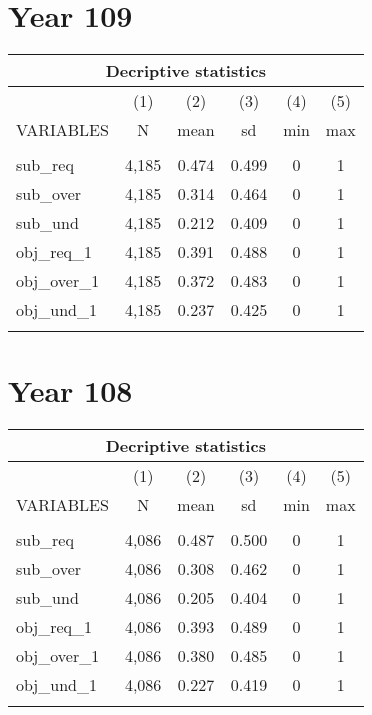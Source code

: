 \documentclass[A4]{article}
\begin{document}
\section*{Year 109}
\begin{tabular}{lccccc}
\multicolumn{6}{c}{Decriptive statistics} \\ \hline
 & (1) & (2) & (3) & (4) & (5) \\
VARIABLES & N & mean & sd & min & max \\ \hline
 &  &  &  &  &  \\
sub\_req & 4,185 & 0.474 & 0.499 & 0 & 1 \\
sub\_over & 4,185 & 0.314 & 0.464 & 0 & 1 \\
sub\_und & 4,185 & 0.212 & 0.409 & 0 & 1 \\
obj\_req\_1 & 4,185 & 0.391 & 0.488 & 0 & 1 \\
obj\_over\_1 & 4,185 & 0.372 & 0.483 & 0 & 1 \\
obj\_und\_1 & 4,185 & 0.237 & 0.425 & 0 & 1 \\
 &  &  &  &  &  \\ \hline
\end{tabular}

\section*{Year 108}
\begin{tabular}{lccccc}
\multicolumn{6}{c}{Decriptive statistics} \\ \hline
 & (1) & (2) & (3) & (4) & (5) \\
VARIABLES & N & mean & sd & min & max \\ \hline
 &  &  &  &  &  \\
sub\_req & 4,086 & 0.487 & 0.500 & 0 & 1 \\
sub\_over & 4,086 & 0.308 & 0.462 & 0 & 1 \\
sub\_und & 4,086 & 0.205 & 0.404 & 0 & 1 \\
obj\_req\_1 & 4,086 & 0.393 & 0.489 & 0 & 1 \\
obj\_over\_1 & 4,086 & 0.380 & 0.485 & 0 & 1 \\
obj\_und\_1 & 4,086 & 0.227 & 0.419 & 0 & 1 \\
 &  &  &  &  &  \\ \hline
 
\end{tabular}
\end{document}
